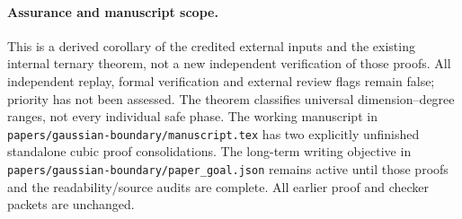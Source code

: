 \documentclass[11pt]{article}
\begin{document}
\paragraph{Assurance and manuscript scope.}
This is a derived corollary of the credited external inputs and the
existing internal ternary theorem, not a new independent verification
of those proofs. All independent replay, formal verification and external
review flags remain false; priority has not been assessed. The theorem
classifies universal dimension--degree ranges, not every individual safe
phase. The working manuscript in
\texttt{papers/gaussian-boundary/manuscript.tex} has two explicitly
unfinished standalone cubic proof consolidations. The long-term writing
objective in \texttt{papers/gaussian-boundary/paper\_goal.json} remains
active until those proofs and the readability/source audits are complete.
All earlier proof and checker packets are unchanged.
\end{document}
